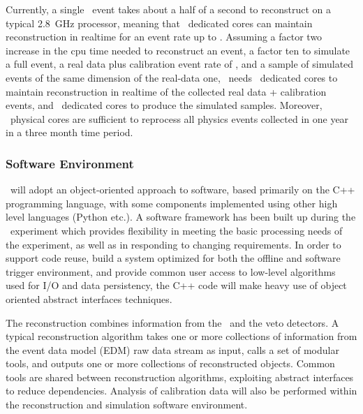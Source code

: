 Currently, a single \DSfs\ event takes about a half of a second to reconstruct on a typical \SI{2.8}{\giga\hertz} processor, meaning that \DSkOffLineCoresRealtimeReconNumber\ dedicated cores can maintain reconstruction in realtime for an event rate up to \DSkComputingRealtimeMaxEventRate.  Assuming a factor two increase in the cpu time needed to reconstruct an event,  a factor ten to simulate a full event, a real data plus calibration event rate of  \DSkRealtimeCalibrationEventRate, and a sample of simulated events of the same dimension of the real-data one, \DSks\ needs \DSkOffLineCoresRealtimeReconNumber\ dedicated cores to maintain reconstruction in realtime of the collected real data + calibration events, and \DSkOffLineCoresSimulationNumber\ dedicated cores to produce the simulated samples. Moreover, \DSkOffLineCoresReprocessOneYearNumber\ physical cores are sufficient to reprocess all physics events collected in one year in a three month time period. 

\subsubsection{Software Environment}
\DSks\ will adopt an object-oriented approach to software, based primarily on the C++ programming language,  with some components implemented using other high level languages (Python etc.). A software framework has been built up during the \DSfs\ experiment which provides flexibility in meeting the basic processing needs of the experiment, as well as in  responding to changing requirements. In order to support code reuse, build a system optimized for both the offline and software trigger environment, and provide common user access to low-level algorithms used for I/O and data persistency, the C++ code will make heavy use of object oriented abstract interfaces techniques.

The reconstruction combines information from the \TPC\ and the veto detectors. A typical reconstruction algorithm takes one or more collections of information from the event data model (EDM) raw data stream as input, calls a set of modular tools, and outputs one or more collections of reconstructed objects. Common tools are shared between reconstruction algorithms, exploiting abstract interfaces to reduce dependencies.  Analysis of calibration data will also be performed within the reconstruction and simulation software environment. 

